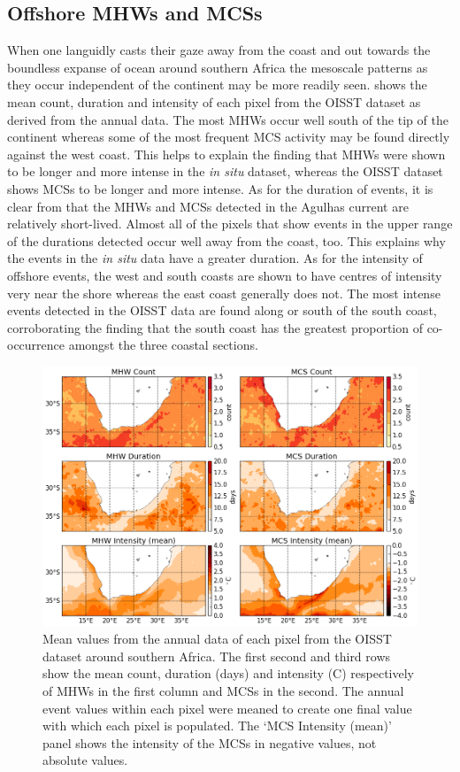 \documentclass[a4paper,10pt,review]{elsarticle}
\begin{document}
\subsection{Offshore MHWs and MCSs}
When one languidly casts their gaze away from the coast and out towards the boundless expanse of ocean around southern Africa the mesoscale patterns as they occur independent of the continent may be more readily seen.   shows the mean count, duration and intensity of each pixel from the OISST dataset as derived from the annual data. The most MHWs occur well south of the tip of the continent whereas some of the most frequent MCS activity may be found directly against the west coast. This helps to explain the finding that MHWs were shown to be longer and more intense in the \emph{in situ} dataset, whereas the OISST dataset shows MCSs to be longer and more intense. As for the duration of events, it is clear from  that the MHWs and MCSs detected in the Agulhas current are relatively short-lived. Almost all of the pixels that show events in the upper range of the durations detected occur well away from the coast, too. This explains why the events in the \emph{in situ} data have a greater duration. As for the intensity of offshore events, the west and south coasts are shown to have centres of intensity very near the shore whereas the east coast generally does not. The most intense events detected in the OISST data are found along or south of the south coast, corroborating the finding that the south coast has the greatest proportion of co-occurrence amongst the three coastal sections.

\begin{figure}
\centering \includegraphics[width=1.0\textwidth]{MHW_MCS_mean.png}
\caption{Mean values from the annual data of each pixel from the OISST dataset around southern Africa. The first second and third rows show the mean count, duration (days) and intensity (\degree C) respectively of MHWs in the first column and MCSs in the second. The annual event values within each pixel were meaned to create one final value with which each pixel is populated. The `MCS Intensity (mean)' panel shows the intensity of the MCSs in negative values, not absolute values.}
\label{fig:Figure6}
\end{figure}
\end{document}
